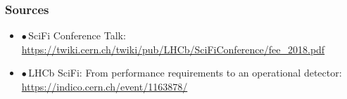 \documentclass[aspectratio=1610, 12pt]{beamer}
\begin{document}
\begin{frame}\frametitle{Sources}
  \begin{itemize}
    \item $\bullet$\,SciFi Conference Talk: \url{https://twiki.cern.ch/twiki/pub/LHCb/SciFiConference/fee_2018.pdf}
    \item $\bullet$\,LHCb SciFi: From performance requirements to an operational detector: \url{https://indico.cern.ch/event/1163878/}
  \end{itemize}
\end{frame}
\end{document}
